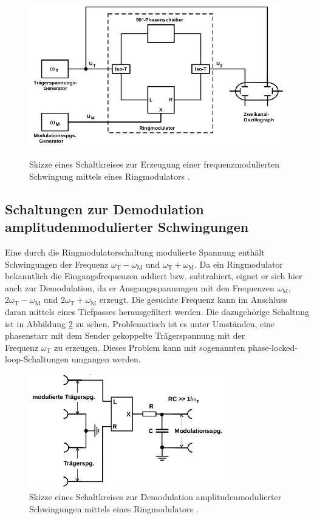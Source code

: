 \begin{figure}
  \centering
  \includegraphics[height=7cm]{JasperErsterSchultag/freqmodschaltung.png}
  \caption{Skizze eines Schaltkreises zur Erzeugung einer frequenzmodulierten Schwingung mittels eines Ringmodulators \cite{anleitung}.}
  \label{fig:freqmodschaltung}
\end{figure}

\subsection{Schaltungen zur Demodulation amplitudenmodulierter Schwingungen}
\label{sec:ampldemod}

Eine durch die Ringmodulatorschaltung modulierte Spannung enthält Schwingungen der
Frequenz $\omega_\text{T}-\omega_\text{M}$ und $\omega_\text{T}+\omega_\text{M}$.
Da ein Ringmodulator bekanntlich die Eingangsfrequenzen addiert bzw. subtrahiert, eignet er sich
hier auch zur Demodulation, da er Ausgangsspannungen mit den Frequenzen $\omega_\text{M}$, $2\omega_\text{T} - \omega_\text{M}$ und
$2\omega_\text{T} + \omega_\text{M}$ erzeugt.
Die gesuchte Frequenz kann im Anschluss daran mittels eines Tiefpasses herausgefiltert werden.
Die dazugehörige Schaltung ist in Abbildung \ref{fig:ampldemodschaltung1} zu sehen.
Problematisch ist es unter Umständen, eine phasenstarr mit dem Sender gekoppelte Trägerspannung mit der \\
Frequenz $\omega_\text{T}$ zu erzeugen. Dieses Problem kann mit sogenannten phase-locked-loop-Schaltungen umgangen werden.

\begin{figure}
  \centering
  \includegraphics[height=5cm]{JasperErsterSchultag/ampldemodschaltung1.png}
  \caption{Skizze eines Schaltkreises zur Demodulation amplitudenmodulierter Schwingungen mittels eines Ringmodulators \cite{anleitung}.}
  \label{fig:ampldemodschaltung1}
\end{figure}

